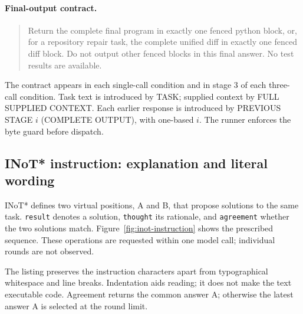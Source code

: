 \paragraph*{Final-output contract.}
\begin{quote}\small
Return the complete final program in exactly one fenced python block, or, for a repository repair task, the complete unified diff in exactly one fenced diff block. Do not output other fenced blocks in this final answer. No test results are available.
\end{quote}
The contract appears in each single-call condition and in stage 3 of each three-call condition. Task text is introduced by TASK; supplied context by FULL SUPPLIED CONTEXT. Each earlier response is introduced by PREVIOUS STAGE $i$ (COMPLETE OUTPUT), with one-based $i$. The runner enforces the byte guard before dispatch.
\clearpage\subsection{INoT* instruction: explanation and literal wording}
\label{app:inot-instruction}
INoT* defines two virtual positions, A and B, that propose solutions to the same task. \texttt{result} denotes a solution, \texttt{thought} its rationale, and \texttt{agreement} whether the two solutions match. Figure~\ref{fig:inot-instruction} shows the prescribed sequence. These operations are requested within one model call; individual rounds are not observed.

The listing preserves the instruction characters apart from typographical whitespace and line breaks. Indentation aids reading; it does not make the text executable code. Agreement returns the common answer A; otherwise the latest answer A is selected at the round limit.

